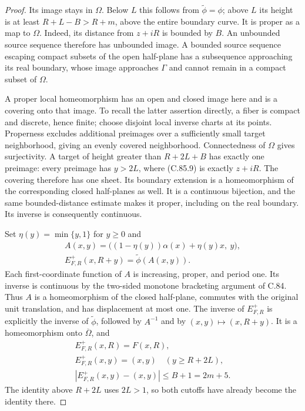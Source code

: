\begin{proof}
Its image stays in $\Omega$. Below $L$
this follows from $\widetilde\phi=\phi$;
above $L$ its height is at least
$R+L-B>R+m$, above the entire boundary
curve. It is proper as a map to $\Omega$.
Indeed, its distance from $z+iR$ is
bounded by $B$. An unbounded source
sequence therefore has unbounded image.
A bounded source sequence escaping
compact subsets of the open half-plane
has a subsequence approaching its real
boundary, whose image approaches
$\Gamma$ and cannot remain in a compact
subset of $\Omega$.

A proper local homeomorphism has an
open and closed image here and is a
covering onto that image. To recall
the latter assertion directly, a fiber
is compact and discrete, hence finite;
choose disjoint local inverse charts
at its points. Properness excludes
additional preimages over a sufficiently
small target neighborhood, giving an
evenly covered neighborhood.
Connectedness of $\Omega$ gives
surjectivity. A target of height
greater than $R+2L+B$ has exactly one
preimage: every preimage has $y>2L$,
where (C.85.9) is exactly $z+iR$.
The covering therefore has one sheet.
Its boundary extension is a
homeomorphism of the corresponding
closed half-planes as well. It is a
continuous bijection, and the same
bounded-distance estimate makes it
proper, including on the real boundary.
Its inverse is consequently continuous.

Set $\eta(y)=\min\{y,1\}$ for $y\geq0$ and
\[
 \begin{gathered}
 A(x,y)=\big((1-\eta(y))\alpha(x)+\eta(y)x,\ y\big),\\
 E^+_{F,R}(x,R+y)=\widetilde\phi(A(x,y)).
 \end{gathered}                                                   \tag{C.85.11}
\]
Each first-coordinate function of $A$
is increasing, proper, and period one.
Its inverse is continuous by the
two-sided monotone bracketing argument
of C.84. Thus $A$ is a homeomorphism
of the closed half-plane, commutes with
the original unit translation, and
has displacement at most one.
The inverse of $E^+_{F,R}$ is explicitly
the inverse of $\widetilde\phi$, followed
by $A^{-1}$ and by $(x,y)\mapsto(x,R+y)$.
It is a homeomorphism onto
$\overline\Omega$, and
\[
 \begin{gathered}
 E^+_{F,R}(x,R)=F(x,R),\\
 E^+_{F,R}(x,y)=(x,y)\quad(y\geq R+2L),\\
 |E^+_{F,R}(x,y)-(x,y)|\leq B+1=2m+5.
 \end{gathered}                                                   \tag{C.85.12}
\]
The identity above $R+2L$ uses $2L>1$,
so both cutoffs have already become
the identity there.


\end{proof}
